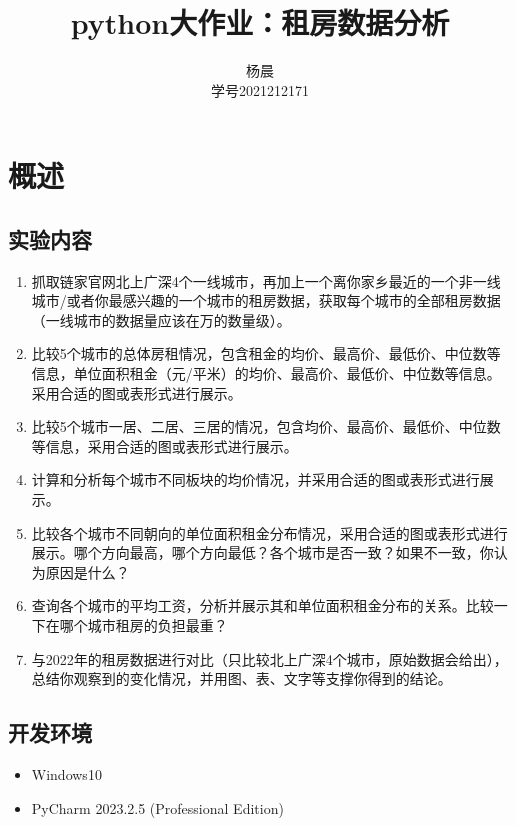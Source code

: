 \documentclass[lang=cn,11pt,a4paper]{elegantpaper}
\title{python大作业：租房数据分析}
\author{杨晨 \\学号2021212171}
\institute{北京邮电大学 计算机学院}
\date{\zhtoday}
\begin{document}
\maketitle

\section{概述}

\subsection{实验内容}

\begin{enumerate}
    \item 抓取链家官网北上广深4个一线城市，再加上一个离你家乡最近的一个非一线城市/或者你最感兴趣的一个城市的租房数据，获取每个城市的全部租房数据（一线城市的数据量应该在万的数量级）。
    \item 比较5个城市的总体房租情况，包含租金的均价、最高价、最低价、中位数等信息，单位面积租金（元/平米）的均价、最高价、最低价、中位数等信息。采用合适的图或表形式进行展示。
    \item 比较5个城市一居、二居、三居的情况，包含均价、最高价、最低价、中位数等信息，采用合适的图或表形式进行展示。
    \item 计算和分析每个城市不同板块的均价情况，并采用合适的图或表形式进行展示。
    \item 比较各个城市不同朝向的单位面积租金分布情况，采用合适的图或表形式进行展示。哪个方向最高，哪个方向最低？各个城市是否一致？如果不一致，你认为原因是什么？
    \item 查询各个城市的平均工资，分析并展示其和单位面积租金分布的关系。比较一下在哪个城市租房的负担最重？
    \item 与2022年的租房数据进行对比（只比较北上广深4个城市，原始数据会给出），总结你观察到的变化情况，并用图、表、文字等支撑你得到的结论。

\end{enumerate}

\subsection{开发环境}

\begin{itemize}
    \item Windows10
    \item PyCharm 2023.2.5 (Professional Edition)
\end{itemize}
\end{document}
